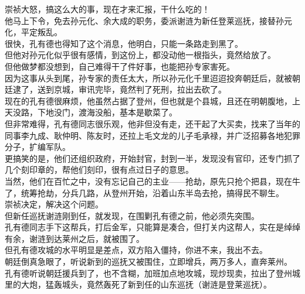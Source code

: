 \begin{multicols}{\theparacolNo}
崇祯大怒，搞这么大的事，现在才来汇报，干什么吃的！\\

他马上下令，免去孙元化、余大成的职务，委派谢涟为新任登莱巡抚，接替孙元化，平定叛乱。\\

很快，孔有德也得知了这个消息，他明白，只能一条路走到黑了。\\

但他对孙元化似乎很有感情，到这份上，都没动他一根指头，竟然给放了。\\

但他做梦都没想到，自己难得干了件好事，也能把孙专家害死。\\

因为这事从头到尾，孙专家的责任太大，所以孙元化千里迢迢投奔朝廷后，就被朝廷逮了，送到京城，审讯完毕，竟然判了死刑，拉出去砍了。\\

现在的孔有德很麻烦，他虽然占据了登州，但也就是个县城，且还在明朝腹地，上天没路，下地没门，渡海没船，基本是歇菜了。\\

但非常难得，孔有德同志很乐观，他非但没有走，还干起了大买卖，找来了当年的同事李九成、耿仲明、陈友时，还拉上毛文龙的儿子毛承禄，并广泛招募各地犯罪分子，扩编军队。\\

更搞笑的是，他们还组织政府，开始封官，封到一半，发现没有官印，还专门抓了几个刻印章的，帮他们刻印，很有点过日子的意思。\\

当然，他们在百忙之中，没有忘记自己的主业——抢劫，原先只抢个把县，现在牛了，统筹抢劫，分兵几路，从登州开始，沿着山东半岛去抢，搞得民不聊生。\\

崇祯决定，解决这个问题。\\

但新任巡抚谢涟刚到任，就发现，在围剿孔有德之前，他必须先突围。\\

孔有德同志手下这帮兵，打后金军，只能算是凑合，但打关内这帮人，实在是绰绰有余，谢涟到达莱州之后，就被围了。\\

但孔有德攻城的水平明显是差点，双方陷入僵持，你进不来，我出不去。\\

朝廷倒真急眼了，听说新到的巡抚又被围住，立即增兵，两万多人，直奔莱州。\\

孔有德听说朝廷援兵到了，也不含糊，加班加点地攻城，现炒现卖，拉出了登州城里的大炮，猛轰城头，竟然轰死了新到任的山东巡抚（谢涟是登莱巡抚）。\\


\end{multicols}
